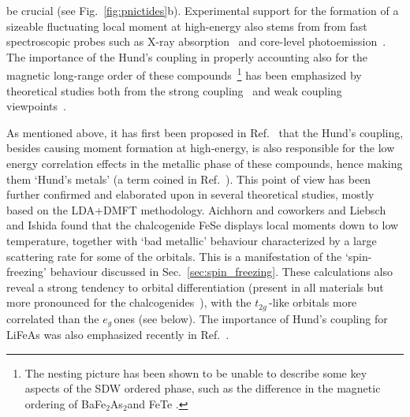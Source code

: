 \documentclass[]{ar2e-changed}%
\def\ttg{$t_{2g}\,$}
\def\eg{$e_{g}\,$}
\def\BFA{BaFe$_2$As$_2$}
\begin{document}
be crucial (see Fig.~\ref{fig:pnictides}b).  
%
Experimental support for the formation of a sizeable
fluctuating local moment at high-energy also stems from 
from fast spectroscopic probes
such as X-ray absorption~\cite{bondino_exchange_multiplets_prl_2008,Kroll_O_K-edge_1111} and core-level
photoemission~\cite{Vilmercati_3score_PES_strongHund}.
%
The importance of the Hund's coupling in properly accounting also for the
magnetic long-range order of these compounds~\footnote{The nesting
  picture has been shown to be unable to describe some key aspects of
  the SDW ordered phase, such as the difference in the magnetic
  ordering of \BFA and FeTe \cite{Johannes_local-moment}.}  has 
been emphasized by theoretical studies both from the strong
coupling~\cite{Zhou_Hund_moment,Yin_spinFermion_unified_prl,Yin_kinetic_frustration_allFeSC,Aichhorn_full_charge_SC_LaFeAsO} 
and weak coupling viewpoints~\cite{Johannes_local-moment,Raghuvanashi_Hund_stabilizes_pi-0_mag}.

%
As mentioned above, it has first been proposed in Ref.~\cite{haule09} that the Hund's coupling, besides causing moment
formation at high-energy, is also responsible for the low energy correlation effects in the metallic phase of
these compounds, hence making them `Hund's metals' (a term coined in Ref.~\cite{Yin_kinetic_frustration_allFeSC}).
%
This point of view has been further confirmed and elaborated upon in
several theoretical studies, mostly based on the LDA+DMFT methodology.
%
Aichhorn and coworkers\cite{Aichhorn_FeSe} and Liebsch and
Ishida\cite{Liebsch_FeSe_spinfreezing} found that the chalcogenide
FeSe displays local moments down to low temperature, together with
`bad metallic' behaviour characterized by a large scattering rate for some of the orbitals. 
This is a manifestation of the `spin-freezing' behaviour discussed in
Sec.~\ref{sec:spin_freezing}.  These calculations also reveal a strong
tendency to orbital differentiation (present in all materials
but more pronounced for the 
chalcogenides~\cite{Aichhorn_FeSe,Liebsch_FeSe_spinfreezing,Yin_kinetic_frustration_allFeSC, Ferber_LiFeAs_LDA_DMFT,yin_powerlaws_arxiv_2012}), 
with the \ttg-like orbitals more correlated than the \eg ones (see below).
%
The importance of Hund's coupling for LiFeAs was also emphasized recently in 
Ref.~\cite{Ferber_LiFeAs_LDA_DMFT}. 
\end{document}
